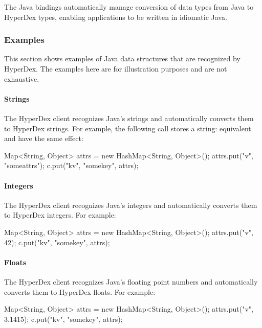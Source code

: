 The Java bindings automatically manage conversion of data types from Java to
HyperDex types, enabling applications to be written in idiomatic Java.

\subsubsection{Examples}
\label{sec:api:java:examples}

This section shows examples of Java data structures that are recognized by
HyperDex.  The examples here are for illustration purposes and are not
exhaustive.

\paragraph{Strings}

The HyperDex client recognizes Java's strings and automatically converts them to
HyperDex strings.  For example, the following call stores a string:
equivalent and have the same effect:

\begin{javacode}
Map<String, Object> attrs = new HashMap<String, Object>();
attrs.put("v", "someattrs");
c.put("kv", "somekey", attrs);
\end{javacode}

\paragraph{Integers}

The HyperDex client recognizes Java's integers and automatically converts them
to HyperDex integers.  For example:

\begin{javacode}
Map<String, Object> attrs = new HashMap<String, Object>();
attrs.put("v", 42);
c.put("kv", "somekey", attrs);
\end{javacode}

\paragraph{Floats}

The HyperDex client recognizes Java's floating point numbers and automatically
converts them to HyperDex floats.  For example:

\begin{javacode}
Map<String, Object> attrs = new HashMap<String, Object>();
attrs.put("v", 3.1415);
c.put("kv", "somekey", attrs);
\end{javacode}

